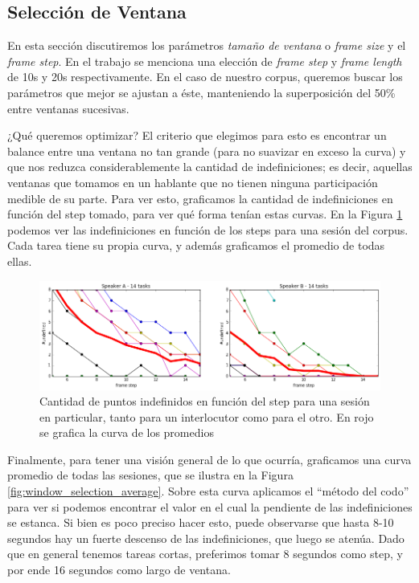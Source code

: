 \subsection{Selección de Ventana}
\label{sec:window_selection}

En esta sección discutiremos los parámetros \emph{tamaño de ventana} o \emph{frame size} y el \emph{frame step}. En el trabajo \cite{KOU2008.2} se menciona una elección de \emph{frame step} y \emph{frame length} de 10s y 20s respectivamente. En el caso de nuestro corpus, queremos buscar los parámetros que mejor se ajustan a éste, manteniendo la superposición del 50\% entre ventanas sucesivas.

¿Qué queremos optimizar? El criterio que elegimos para esto es encontrar un balance entre una ventana no tan grande (para no suavizar en exceso la curva) y que nos reduzca considerablemente la cantidad de indefiniciones; es decir, aquellas ventanas que tomamos en un hablante que no tienen ninguna participación medible de su parte. Para ver esto, graficamos la cantidad de indefiniciones en función del step tomado, para ver qué forma tenían estas curvas. En la Figura \ref{fig:window_selection_session} podemos ver las indefiniciones en función de los steps para una sesión del corpus. Cada tarea tiene su propia curva, y además graficamos el promedio de todas ellas.

\begin{figure}
\centering
\includegraphics[width=15cm]{images/window_selection_for_session.png}
\caption{Cantidad de puntos indefinidos en función del step para una sesión en particular, tanto para un interlocutor como para el otro. En rojo se grafica la curva de los promedios}
\label{fig:window_selection_session}
\end{figure}

Finalmente, para tener una visión general de lo que ocurría, graficamos una curva promedio de todas las sesiones, que se ilustra en la Figura \ref{fig:window_selection_average}. Sobre esta curva aplicamos el ``método del codo'' para ver si podemos encontrar el valor en el cual la pendiente de las indefiniciones se estanca. Si bien es poco preciso hacer esto, puede observarse que hasta 8-10 segundos hay un fuerte descenso de las indefiniciones, que luego se atenúa. Dado que en general tenemos tareas cortas, preferimos tomar 8 segundos como step, y por ende 16 segundos como largo de ventana.

